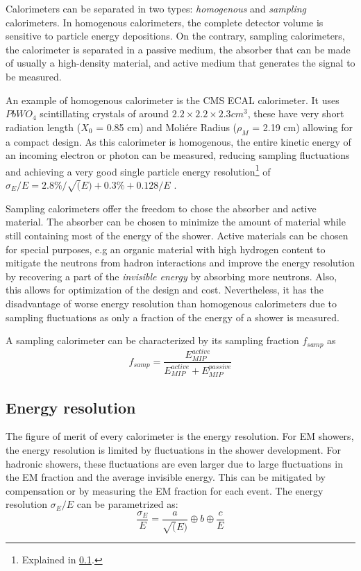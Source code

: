 Calorimeters can be separated in two types: \textit{homogenous} and \textit{sampling} calorimeters. In homogenous calorimeters, the complete detector volume is sensitive to particle energy depositions. On the contrary, sampling calorimeters, the calorimeter is separated in a passive medium, the absorber that can be made of usually a high-density material, and active medium that generates the signal to be measured.

An example of homogenous calorimeter is the CMS ECAL calorimeter. It uses $PbWO_4$ scintillating crystals of around $2.2 \times 2.2 \times 2.3 cm^3$, these have very short radiation length ($X_0$ = 0.85 cm) and Moli\'ere Radius ($\rho_M$ = 2.19 cm) allowing for a compact design. As this calorimeter is homogenous, the entire kinetic energy of an incoming electron or photon can be measured, reducing sampling fluctuations and achieving a very good single particle energy resolution\footnote{Explained in \ref{subsec:EnergyReso}.} of $\sigma_E/E = 2.8\%/\sqrt(E) + 0.3\% + 0.128/E$ \cite{1742-6596-587-1-012001}.

Sampling calorimeters offer the freedom to chose the absorber and active material. The absorber can be chosen to minimize the amount of material while still containing most of the energy of the shower. Active materials can be chosen for special purposes, e.g an organic material with high hydrogen content to mitigate the neutrons from hadron interactions and improve the energy resolution by recovering a part of the \textit{invisible energy} by absorbing more neutrons. Also, this allows for optimization of the design and cost. Nevertheless, it has the disadvantage of worse energy resolution than homogenous calorimeters due to sampling fluctuations as only a fraction of the energy of a shower is measured.

A sampling calorimeter can be characterized by its sampling fraction $f_{samp}$ as
\begin{equation}
  f_{samp} = \frac{E_{MIP}^{active}}{E_{MIP}^{active} + E_{MIP}^{passive}}
\end{equation}

\subsection{Energy resolution}
\label{subsec:EnergyReso}

The figure of merit of every calorimeter is the energy resolution. For EM showers, the energy resolution is limited by fluctuations in the shower development. For hadronic showers, these fluctuations are even larger due to large fluctuations in the EM fraction and the average invisible energy. This can be mitigated by compensation or by measuring the EM fraction for each event.
The energy resolution $\sigma_E/E$ can be parametrized as:
\begin{equation}
  \frac{\sigma_E}{E} = \frac{a}{\sqrt(E)} \oplus b \oplus \frac{c}{E}
\end{equation}

